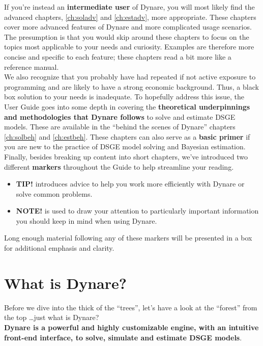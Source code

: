 If you're instead an \textbf{intermediate user} of Dynare, you will most likely find the advanced chapters, \ref{ch:soladv} and \ref{ch:estadv}, more appropriate. These chapters cover more advanced features of Dynare and more complicated usage scenarios. The presumption is that you would skip around these chapters to focus on the topics most applicable to your needs and curiosity. Examples are therefore more concise and specific to each feature; these chapters read a bit more like a reference manual.\\

We also recognize that you probably have had repeated if not active exposure to programming and are likely to have a strong economic background. Thus, a black box solution to your needs is inadequate. To hopefully address this issue, the User Guide goes into some depth in covering the \textbf{theoretical underpinnings and methodologies that Dynare follows} to solve and estimate DSGE models. These are available in the ``behind the scenes of Dynare'' chapters \ref{ch:solbeh} and \ref{ch:estbeh}. These chapters can also serve as a \textbf{basic primer} if you are new to the practice of DSGE model solving and Bayesian estimation. \\

Finally, besides breaking up content into short chapters, we've introduced two different \textbf{markers} throughout the Guide to help streamline your reading.
\begin{itemize}
\item \textbf{\textsf{TIP!}} introduces advice to help you work more efficiently with Dynare or solve common problems.  
\item \textbf{\textsf{NOTE!}} is used to draw your attention to particularly important information you should keep in mind when using Dynare. 
\end{itemize}
Long enough material following any of these markers will be presented in a box for additional emphasis and clarity. 


\section{What is Dynare?}
Before we dive into the thick of the ``trees'', let's have a look at the ``forest'' from the top \ldots just what is Dynare? \\

\textbf{Dynare is a powerful and highly customizable engine, with an intuitive front-end interface, to solve, simulate and estimate DSGE models}. \\

